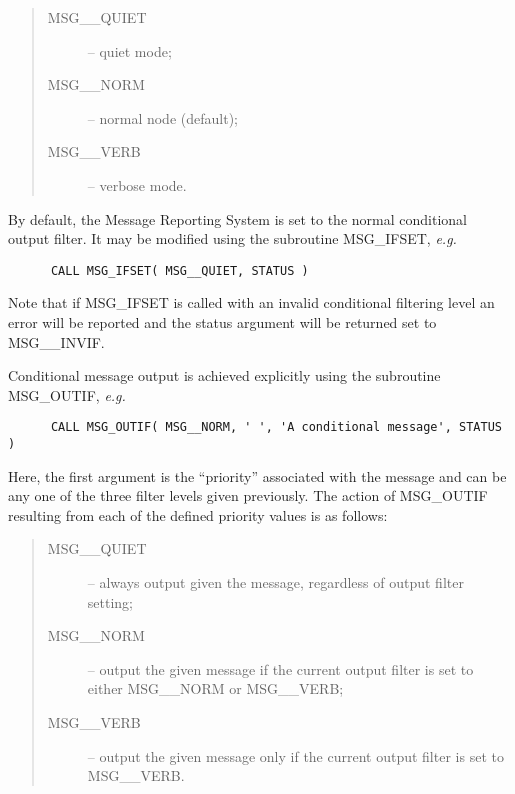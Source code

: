 \begin {quote}
\begin {description}
\item [MSG\_\_QUIET] -- quiet mode;
\item [MSG\_\_NORM] -- normal node (default);
\item [MSG\_\_VERB] -- verbose mode.
\end {description}
\end {quote}

By default, the Message Reporting System is set to the normal conditional 
output filter.
It may be modified using the subroutine MSG\_IFSET, {\em e.g.}

\begin {small}
\begin{verbatim}
      CALL MSG_IFSET( MSG__QUIET, STATUS )
\end{verbatim}
\end {small}

Note that if MSG\_IFSET is called with an invalid conditional filtering level
an error will be reported and the status argument will be returned set
to MSG\_\_INVIF.

Conditional message output is achieved explicitly using the subroutine
MSG\_OUTIF, {\em e.g.}

\begin {small}
\begin{verbatim}
      CALL MSG_OUTIF( MSG__NORM, ' ', 'A conditional message', STATUS )
\end{verbatim}
\end {small}

Here, the first argument is the ``priority'' associated with the message and 
can be any one of the three filter levels given previously.
The action of MSG\_OUTIF resulting from each of the defined priority values is 
as follows:

\begin {quote}
\begin {description}
\item [MSG\_\_QUIET] -- always output given the message, regardless of output
filter setting;
\item [MSG\_\_NORM] -- output the given message if the current output filter is
set to either MSG\_\_NORM or MSG\_\_VERB;
\item [MSG\_\_VERB] -- output the given message only if the current output
filter is set to MSG\_\_VERB.
\end {description}
\end {quote}

